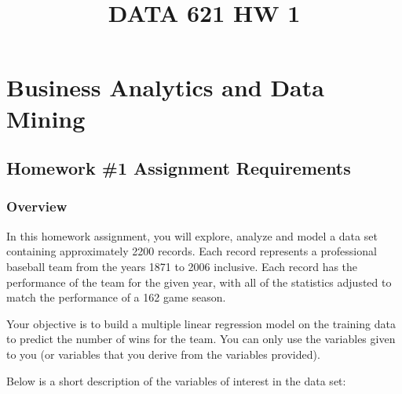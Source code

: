 \documentclass[
]{article}
\title{DATA 621 HW 1}
\author{}
\date{\vspace{-2.5em}}
\begin{document}
\maketitle

\hypertarget{business-analytics-and-data-mining}{%
\section{\texorpdfstring{\textbf{Business Analytics and Data
Mining}}{Business Analytics and Data Mining}}\label{business-analytics-and-data-mining}}

\hypertarget{homework-1-assignment-requirements}{%
\subsection{Homework \#1 Assignment
Requirements}\label{homework-1-assignment-requirements}}

\hypertarget{overview}{%
\subsubsection{\texorpdfstring{\textbf{Overview}}{Overview}}\label{overview}}

In this homework assignment, you will explore, analyze and model a data
set containing approximately 2200 records. Each record represents a
professional baseball team from the years 1871 to 2006 inclusive. Each
record has the performance of the team for the given year, with all of
the statistics adjusted to match the performance of a 162 game season.

Your objective is to build a multiple linear regression model on the
training data to predict the number of wins for the team. You can only
use the variables given to you (or variables that you derive from the
variables provided).

Below is a short description of the variables of interest in the data
set:
\end{document}
